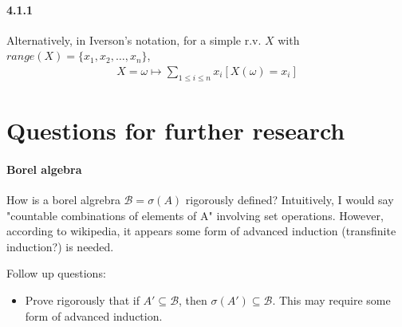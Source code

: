 \documentclass[a4paper]{article}
\newcommand{\borel}[0]{\mathcal{B}} %
\newcommand{\seq}[2]{#1_1,#1_2,\dots,#1_{#2}} %
\begin{document}
\paragraph{4.1.1} Alternatively, in Iverson's notation, for a simple r.v. $X$ with $range(X) = \{\seq{x}{n}\}$,
\begin{align*}
	X = \omega\mapsto\sum_{1\leq i\leq n}x_i[X(\omega) = x_i]
\end{align*}

\section*{Questions for further research}
\paragraph{Borel algebra} How is a borel algrebra $\borel = \sigma(A)$ rigorously defined? Intuitively, I would say "countable combinations of elements of A" involving set operations. However, according to wikipedia, it appears some form of advanced induction (transfinite induction?) is needed.

Follow up questions:
\begin{itemize}
	\item Prove rigorously that if $A'\subseteq \borel$, then $\sigma(A')\subseteq \borel$. This may require some form of advanced induction.
\end{itemize}
\end{document}
